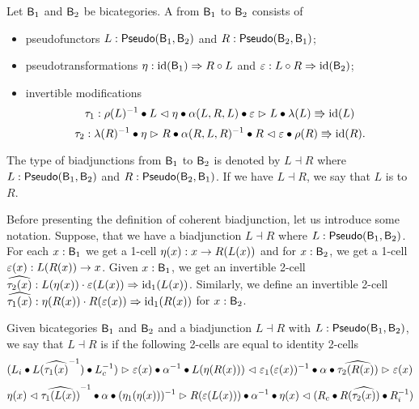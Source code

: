 \begin{definition}
Let $\mathsf{B}_1$ and $\mathsf{B}_2$ be bicategories.
A  from $\mathsf{B}_1$ to $\mathsf{B}_2$ consists of
\begin{itemize}
	\item pseudofunctors $L : \mathsf{Pseudo}(\mathsf{B}_1, \mathsf{B}_2)$ and $R : \mathsf{Pseudo}(\mathsf{B}_2, \mathsf{B}_1)$;
	\item pseudotransformations $\eta : \operatorname{id}(\mathsf{B}_1) \Rightarrow R \circ L$ and $\varepsilon : L \circ R \Rightarrow \operatorname{id}(\mathsf{B}_2)$;
	\item invertible modifications
	\[
	\tau_1 : \rho(L)^{-1} \bullet L \vartriangleleft \eta \bullet \alpha(L, R, L) \bullet \varepsilon \vartriangleright L \bullet \lambda(L) \Rrightarrow \operatorname{id}(L)
	\]
	\[
	\tau_2 : \lambda(R)^{-1} \bullet \eta \vartriangleright R \bullet \alpha(R, L, R)^{-1} \bullet R \vartriangleleft \varepsilon \bullet \rho(R) \Rrightarrow \operatorname{id}(R).
	\]
\end{itemize}
The type of biadjunctions from $\mathsf{B}_1$ to $\mathsf{B}_2$ is denoted by $L \dashv R$
where $L : \mathsf{Pseudo}(\mathsf{B}_1, \mathsf{B}_2)$ and $R : \mathsf{Pseudo}(\mathsf{B}_2, \mathsf{B}_1)$.
If we have $L \dashv R$, we say that $L$ is  to $R$.
\end{definition}

Before presenting the definition of coherent biadjunction, let us introduce some notation.
Suppose, that we have a biadjunction $L \dashv R$ where $L : \mathsf{Pseudo}(\mathsf{B}_1, \mathsf{B}_2)$.
For each $x : \mathsf{B}_1$ we get a 1-cell $\eta(x) : x \rightarrow R(L(x))$ and for $x : \mathsf{B}_2$, we get a 1-cell $\varepsilon(x) : L(R(x)) \rightarrow x$.
Given $x : \mathsf{B}_1$, we get an invertible 2-cell $\widehat{\tau_2(x)} : L(\eta(x)) \cdot \varepsilon(L(x)) \Rightarrow \operatorname{id}_1(L(x))$.
Similarly, we define an invertible 2-cell $\widehat{\tau_1(x)} : \eta(R(x)) \cdot R(\varepsilon(x)) \Rightarrow \operatorname{id}_1(R(x))$ for $x : \mathsf{B}_2$.

\begin{definition}
Given bicategories $\mathsf{B}_1$ and $\mathsf{B}_2$ and a biadjunction $L \dashv R$ with $L : \mathsf{Pseudo}(\mathsf{B}_1, \mathsf{B}_2)$, we say that $L \dashv R$ is  if the following 2-cells are equal to identity 2-cells
\begin{equation*}
\begin{split}
({L}_i \bullet L(\widehat{\tau_1(x)}^{-1}) \bullet {L}_c^{-1}) \vartriangleright \varepsilon(x)
\bullet \alpha^{-1}
\bullet L(\eta(R(x))) \vartriangleleft \varepsilon_1(\varepsilon(x))^{-1}
\bullet \alpha
\bullet \widehat{\tau_2(R(x))} \vartriangleright \varepsilon(x)
\end{split}
\end{equation*}
\begin{equation*}
\begin{split}
\eta(x) \vartriangleleft \widehat{\tau_1(L(x))}^{-1}
\bullet \alpha
\bullet (\eta_1(\eta(x)))^{-1} \vartriangleright R(\varepsilon(L(x)))
\bullet \alpha^{-1}
\bullet \eta(x) \vartriangleleft ({R}_c \bullet R(\widehat{\tau_2(x)}) \bullet {R}_i^{-1})
\end{split}
\end{equation*}
\end{definition}

